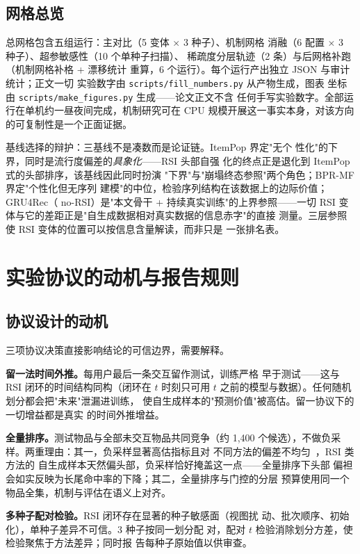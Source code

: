 \subsection{网格总览}
总网格包含五组运行：主对比（5 变体 $\times$ 3 种子）、机制网格
消融（6 配置 $\times$ 3 种子）、超参敏感性（10 个单种子扫描）、
稀疏度分层轨迹（2 条）与后网格补跑（机制网格补格 + 漂移统计
重算，6 个运行）。每个运行产出独立 JSON 与审计统计；正文一切
实验数字由 \texttt{scripts/fill\_numbers.py} 从产物生成，图表
坐标由 \texttt{scripts/make\_figures.py} 生成——论文正文不含
任何手写实验数字。全部运行在单机约一昼夜间完成，机制研究可在
CPU 规模开展这一事实本身，对该方向的可复制性是一个正面证据。

基线选择的辩护：三基线不是凑数而是论证链。ItemPop 界定"无个
性化"的下界，同时是流行度偏差的\emph{具象化}——RSI 头部自强
化的终点正是退化到 ItemPop 式的头部排序，该基线因此同时扮演
"下界"与"崩塌终态参照"两个角色；BPR-MF 界定"个性化但无序列
建模"的中位，检验序列结构在该数据上的边际价值；GRU4Rec（
no-RSI）是"本文骨干 + 持续真实训练"的上界参照——一切 RSI
变体与它的差距正是"自生成数据相对真实数据的信息赤字"的直接
测量。三层参照使 RSI 变体的位置可以按信息含量解读，而非只是
一张排名表。

\section{实验协议的动机与报告规则}
\subsection{协议设计的动机}
三项协议决策直接影响结论的可信边界，需要解释。

\textbf{留一法时间外推。}每用户最后一条交互留作测试，训练严格
早于测试——这与 RSI 闭环的时间结构同构（闭环在 $t$ 时刻只可用
$t$ 之前的模型与数据）。任何随机划分都会把"未来"泄漏进训练，
使自生成样本的"预测价值"被高估。留一协议下的一切增益都是真实
的时间外推增益。

\textbf{全量排序。}测试物品与全部未交互物品共同竞争（约 1{,}400
个候选），不做负采样。两重理由：其一，负采样显著高估指标且对
不同方法的偏差不均匀~\cite{dacrema2019worrying}，RSI 类方法的
自生成样本天然偏头部，负采样恰好掩盖这一点——全量排序下头部
偏袒会如实反映为长尾命中率的下降；其二，全量排序与门控的分层
预算使用同一个物品全集，机制与评估在语义上对齐。

\textbf{多种子配对检验。}RSI 闭环存在显著的种子敏感面（视图扰
动、批次顺序、初始化），单种子差异不可信。3 种子按同一划分配
对，配对 $t$ 检验消除划分方差，使检验聚焦于方法差异；同时报
告每种子原始值以供审查。

